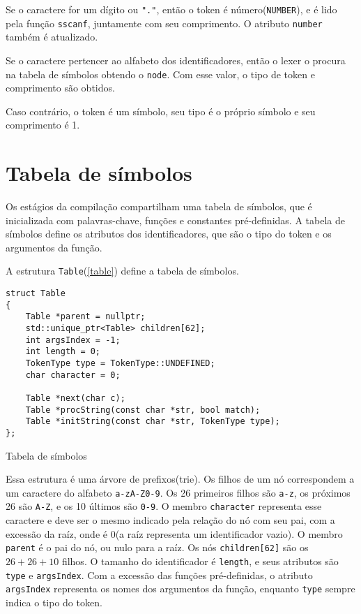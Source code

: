 \documentclass[10pt,a4paper]{article}
\newenvironment{code}{\captionsetup{type=listing}}{}
\begin{document}
Se o caractere for um dígito ou \texttt{"."}, então o token é número(\texttt{NUMBER}),
e é lido pela função \texttt{sscanf}, juntamente com seu comprimento. O atributo \texttt{number} também é atualizado.

Se o caractere pertencer ao alfabeto dos identificadores,
então o lexer o procura na tabela de símbolos obtendo o \texttt{node}.
Com esse valor, o tipo de token e comprimento são obtidos.

Caso contrário, o token é um símbolo, seu tipo é o próprio símbolo e seu comprimento é 1.
\section{Tabela de símbolos}
Os estágios da compilação compartilham uma tabela de símbolos, que é inicializada com palavras-chave,
funções e constantes pré-definidas.
A tabela de símbolos define os atributos dos identificadores,
que são o tipo do token e os argumentos da função. 

A estrutura \texttt{Table}(\ref{table}) define a tabela de símbolos.

\begin{code}
\begin{verbatim}
struct Table
{
    Table *parent = nullptr;
    std::unique_ptr<Table> children[62];
    int argsIndex = -1;
    int length = 0;
    TokenType type = TokenType::UNDEFINED;
    char character = 0;

    Table *next(char c);
    Table *procString(const char *str, bool match);
    Table *initString(const char *str, TokenType type);
};
\end{verbatim}
\caption{Tabela de símbolos}
\label{table}
\end{code}

Essa estrutura é uma árvore de prefixos(trie).
Os filhos de um nó correspondem a um caractere do alfabeto \texttt{a-zA-Z0-9}.
Os 26 primeiros filhos são \texttt{a-z}, os próximos 26 são \texttt{A-Z}, e os 10 últimos são \texttt{0-9}.
O membro \texttt{character} representa esse caractere e deve ser o mesmo indicado pela relação do nó com seu pai,
com a excessão da raíz, onde é 0(a raíz representa um identificador vazio).
O membro \texttt{parent} é o pai do nó, ou nulo para a raíz.
Os nós \texttt{children[62]} são os $26+26+10$ filhos.
O tamanho do identificador é \texttt{length}, e seus atributos são \texttt{type} e \texttt{argsIndex}.
Com a excessão das funções pré-definidas, o atributo \texttt{argsIndex} representa os nomes dos argumentos da função,
enquanto \texttt{type} sempre indica o tipo do token.
\end{document}
